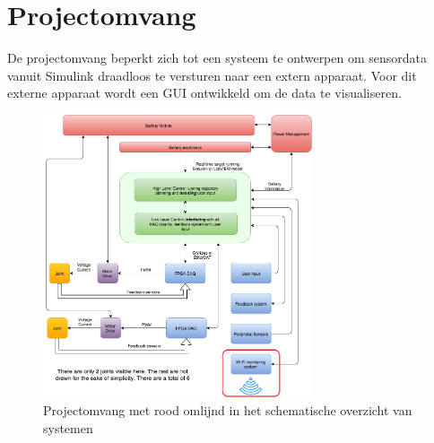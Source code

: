 \section{Projectomvang}
De projectomvang beperkt zich tot een systeem te ontwerpen om sensordata vanuit Simulink draadloos te versturen naar een extern apparaat. Voor dit externe apparaat wordt een GUI ontwikkeld om de data te visualiseren.
\begin{figure}[!ht]
	\centering
	\includegraphics[width=300px]{Scope}
	\caption{Projectomvang met rood omlijnd in het schematische overzicht van systemen}
\end{figure}
